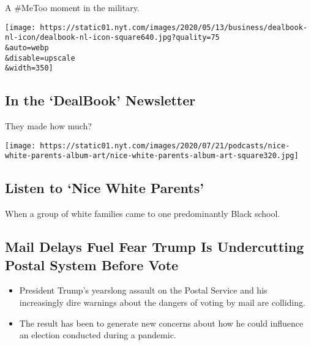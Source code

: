 A \#MeToo moment in the military.

\href{/2020/07/31/business/dealbook/tech-earnings-economy.html}{}

\texttt{[image: https://static01.nyt.com/images/2020/05/13/business/dealbook-nl-icon/dealbook-nl-icon-square640.jpg?quality=75\\\&auto=webp\\\&disable=upscale\\\&width=350]}

\href{/2020/07/31/business/dealbook/tech-earnings-economy.html}{}

\hypertarget{in-the-dealbook-newsletter}{%
\subsection{In the `DealBook'
Newsletter}\label{in-the-dealbook-newsletter}}

They made how much?

\href{/2020/07/30/podcasts/nice-white-parents-serial.html}{}

\texttt{[image: https://static01.nyt.com/images/2020/07/21/podcasts/nice-white-parents-album-art/nice-white-parents-album-art-square320.jpg]}

\href{/2020/07/30/podcasts/nice-white-parents-serial.html}{}

\hypertarget{listen-to-nice-white-parents}{%
\subsection{Listen to `Nice White
Parents'}\label{listen-to-nice-white-parents}}

When a group of white families came to one predominantly Black school.

\href{/2020/07/31/us/politics/trump-usps-mail-delays.html}{}

\hypertarget{mail-delays-fuel-fear-trump-is-undercutting-postal-system-before-vote}{%
\subsection{Mail Delays Fuel Fear Trump Is Undercutting Postal System
Before
Vote}\label{mail-delays-fuel-fear-trump-is-undercutting-postal-system-before-vote}}

\begin{itemize}
\tightlist
\item
  President Trump's yearslong assault on the Postal Service and his
  increasingly dire warnings about the dangers of voting by mail are
  colliding.
\item
  The result has been to generate new concerns about how he could
  influence an election conducted during a pandemic.
\end{itemize}

